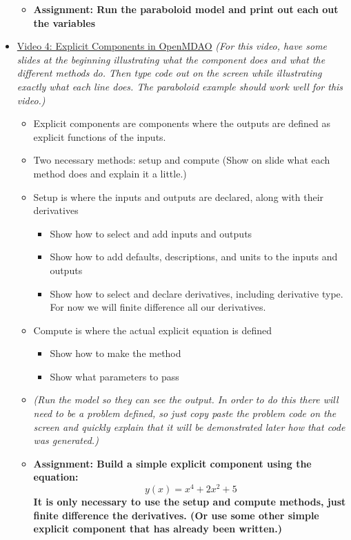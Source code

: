 \documentclass[12pt, letterpaper]{article}
\begin{document}
\begin{itemize}
\begin{itemize}
			\item \textbf{Assignment: Run the paraboloid model and print out each out the variables}
		\end{itemize}
	\item \underline{Video 4: Explicit Components in OpenMDAO} \textit{(For this video, have some slides at the beginning illustrating what the 				component does and what the different methods do. Then type code out on the screen while illustrating exactly what each line does. The 					paraboloid example should work well for this video.)}
		\begin{itemize}
			\item Explicit components are components where the outputs are defined as explicit functions of the inputs.
			\item Two necessary methods: setup and compute (Show on slide what each method does and explain it a little.)
			\item Setup is where the inputs and outputs are declared, along with their derivatives
				\begin{itemize}
					\item Show how to select and add inputs and outputs
					\item Show how to add defaults, descriptions, and units to the inputs and outputs
					\item Show how to select and declare derivatives, including derivative type. For now we will finite difference all our derivatives.
				\end{itemize}
			\item Compute is where the actual explicit equation is defined
				\begin{itemize}
					\item Show how to make the method
					\item Show what parameters to pass
				\end{itemize}
			\item \textit{(Run the model so they can see the output. In order to do this there will need to be a problem defined, so just copy paste the 				problem code on the screen and quickly explain that it will be demonstrated later how that code was generated.)}
			\item \textbf{Assignment: Build a simple explicit component using the equation: $$y(x)=x^4+2x^2+5$$ It is only necessary to use the 						setup and compute methods, just finite difference the derivatives. (Or use some other simple explicit component that has already been 						written.)}
		\end{itemize}

\end{itemize}
\end{document}
